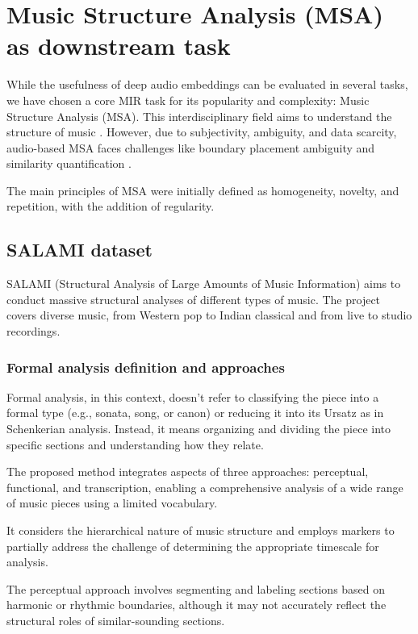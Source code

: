 \section{Music Structure Analysis (MSA) as downstream task}

While the usefulness of deep audio embeddings can be evaluated in several tasks, we have chosen a core MIR task for its popularity and complexity: Music Structure Analysis (MSA). This interdisciplinary field aims to understand the structure of music \cite{Nieto2020Audio-BasedApplications}. However, due to subjectivity, ambiguity, and data scarcity, audio-based MSA faces challenges like boundary placement ambiguity and similarity quantification \cite{NietoPerceptualMusic}. 

The main principles of MSA were initially defined as homogeneity, novelty, and repetition, with the addition of regularity. 

\subsection{SALAMI dataset}

SALAMI (Structural Analysis of Large Amounts of Music Information) \cite{Smith2011DESIGNANNOTATIONS} aims to conduct massive structural analyses of different types of music. The project covers diverse music, from Western pop to Indian classical and from live to studio recordings.

\subsubsection{Formal analysis definition and approaches}
Formal analysis, in this context, doesn't refer to classifying the piece into a formal type (e.g., sonata, song, or canon) or reducing it into its Ursatz as in Schenkerian analysis. Instead, it means organizing and dividing the piece into specific sections and understanding how they relate.

The proposed method integrates aspects of three approaches: perceptual, functional, and transcription, enabling a comprehensive analysis of a wide range of music pieces using a limited vocabulary. 

It considers the hierarchical nature of music structure and employs markers to partially address the challenge of determining the appropriate timescale for analysis. 

The perceptual approach involves segmenting and labeling sections based on harmonic or rhythmic boundaries, although it may not accurately reflect the structural roles of similar-sounding sections. 

